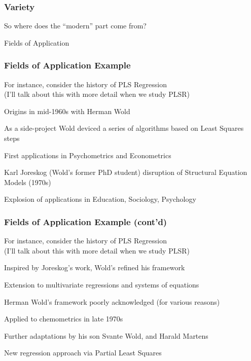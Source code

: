 \documentclass[12pt]{beamer}\usepackage[]{graphicx}\usepackage[]{color}
\begin{document}

\begin{frame}
\frametitle{Variety}
\begin{center}
\end{center}
\end{frame}


\begin{frame}
\begin{center}
{\lolit So where does the ``modern'' part come from?}

\Large{\mdlit Fields of Application}
\end{center}
\end{frame}


\begin{frame}
\frametitle{Fields of Application Example}

For instance, consider the history of PLS Regression \\
{\scriptsize \lolit (I'll talk about this with more detail when we study PLSR)}

\bi
  \item Origins in mid-1960s with Herman Wold
  \item As a side-project Wold deviced a series of algorithms based on Least Squares steps
  \item First applications in Psychometrics and Econometrics
  \item Karl Joreskog (Wold's former PhD student) disruption 
  of Structural Equation Models (1970s)
  \item Explosion of applications in Education, Sociology, Psychology
\ei

\end{frame}


\begin{frame}
\frametitle{Fields of Application Example (cont'd)}

For instance, consider the history of PLS Regression \\
{\scriptsize \lolit (I'll talk about this with more detail when we study PLSR)}

\bi
  \item Inspired by Joreskog's work, Wold's refined his framework 
  \item Extension to multivariate regressions and systems of equations
  \item Herman Wold's framework poorly acknowledged (for various reasons)
  \item Applied to chemometrics in late 1970s
  \item Further adaptations by his son Svante Wold, and Harald Martens
  \item New regression approach via Partial Least Squares
\ei

\end{frame}
\end{document}
